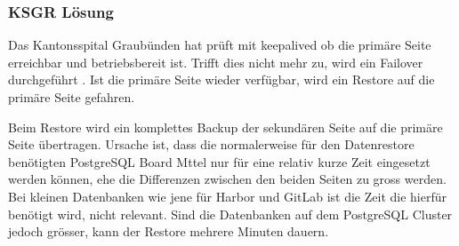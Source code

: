 
\begin{flushleft}
    \subsubsection{KSGR Lösung}
    Das Kantonsspital Graubünden hat prüft mit \gls{keepalived} ob die primäre Seite erreichbar und betriebsbereit ist.
    Trifft dies nicht mehr zu, wird ein \Gls{Failover} durchgeführt \cite{NLF2IDBZ}.
    Ist die primäre Seite wieder verfügbar, wird ein Restore auf die primäre Seite gefahren.
\end{flushleft}
\begin{flushleft}
    Beim Restore wird ein komplettes Backup der sekundären Seite auf die primäre Seite übertragen.
    Ursache ist, dass die normalerweise für den Datenrestore benötigten \Gls{PostgreSQL} Board Mttel nur für eine relativ kurze Zeit eingesetzt werden können,
    ehe die Differenzen zwischen den beiden Seiten zu gross werden.
    Bei kleinen Datenbanken wie jene für \Gls{Harbor} und \Gls{GitLab} ist die Zeit die hierfür benötigt wird, nicht relevant.
    Sind die Datenbanken auf dem \Gls{PostgreSQL Cluster} jedoch grösser, kann der Restore mehrere Minuten dauern.
\end{flushleft}